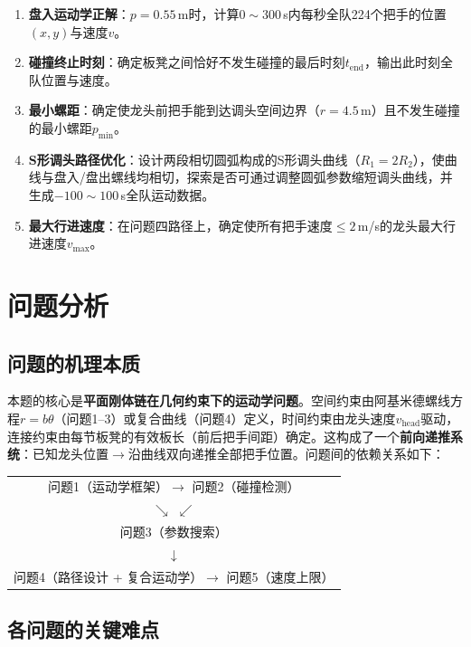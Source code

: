 \documentclass[12pt]{ctexart}
\begin{document}
\begin{enumerate}[label=(\arabic*)]
  \item \textbf{盘入运动学正解}：$p=0.55$\,m时，计算$0\sim300$\,s内每秒全队224个把手的位置$(x,y)$与速度$v$。
  \item \textbf{碰撞终止时刻}：确定板凳之间恰好不发生碰撞的最后时刻$t_{\text{end}}$，输出此时刻全队位置与速度。
  \item \textbf{最小螺距}：确定使龙头前把手能到达调头空间边界（$r=4.5$\,m）且不发生碰撞的最小螺距$p_{\min}$。
  \item \textbf{S形调头路径优化}：设计两段相切圆弧构成的S形调头曲线（$R_1=2R_2$），使曲线与盘入/盘出螺线均相切，探索是否可通过调整圆弧参数缩短调头曲线，并生成$-100\sim100$\,s全队运动数据。
  \item \textbf{最大行进速度}：在问题四路径上，确定使所有把手速度$\le 2$\,m/s的龙头最大行进速度$v_{\max}$。
\end{enumerate}

\FloatBarrier

\section{问题分析}

\subsection{问题的机理本质}

本题的核心是\textbf{平面刚体链在几何约束下的运动学问题}。空间约束由阿基米德螺线方程$r=b\theta$（问题1--3）或复合曲线（问题4）定义，时间约束由龙头速度$v_{\text{head}}$驱动，连接约束由每节板凳的有效板长（前后把手间距）确定。这构成了一个\textbf{前向递推系统}：已知龙头位置$\to$沿曲线双向递推全部把手位置。问题间的依赖关系如下：

\begin{center}
\begin{tabular}{c}
问题1（运动学框架）$\longrightarrow$ 问题2（碰撞检测）\\
\quad $\searrow$ \qquad\qquad\qquad\qquad $\swarrow$ \\
\qquad\quad 问题3（参数搜索）\\
\quad $\downarrow$ \\
问题4（路径设计 + 复合运动学）$\longrightarrow$ 问题5（速度上限）
\end{tabular}
\end{center}

\subsection{各问题的关键难点}
\end{document}
